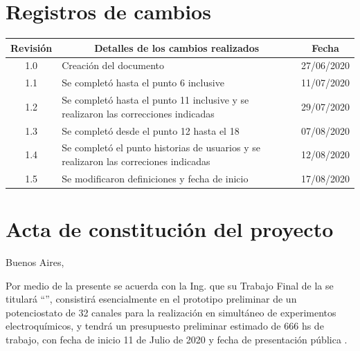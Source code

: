 \documentclass[11pt]{charter}
\begin{document}
\maketitle
\thispagestyle{empty}
\pagebreak


\thispagestyle{empty}
{\setlength{\parskip}{0pt}
\tableofcontents{}
}
\pagebreak


\section{Registros de cambios}
\label{sec:registro}


\begin{table}[ht]
\label{tab:registro}
\centering

\begin{tabularx}{\linewidth}{@{}|c|X|c|@{}}
\hline
\rowcolor[HTML]{C0C0C0} 
Revisión & \multicolumn{1}{c|}{\cellcolor[HTML]{C0C0C0}Detalles de los cambios realizados} & Fecha      \\ \hline
1.0      & Creación del documento     & 27/06/2020 \\ \hline
1.1      & Se completó hasta el punto 6 inclusive  & 11/07/2020  \\ \hline
1.2      & Se completó hasta el punto 11 inclusive y se realizaron las correcciones indicadas                  & 29/07/2020\\ \hline
1.3      & Se completó desde el punto 12 hasta el 18   & 07/08/2020\\ \hline
1.4      & Se completó el punto historias de usuarios y se realizaron las correciones indicadas  & 12/08/2020\\ \hline
1.5      & Se modificaron definiciones y fecha de inicio  & 17/08/2020\\ \hline
\end{tabularx}
\end{table}

\pagebreak



\section{Acta de constitución del proyecto}
\label{sec:acta}

\begin{flushright}
Buenos Aires, \fechaInicioName
\end{flushright}

\vspace{2cm}

Por medio de la presente se acuerda con la Ing. \authorname\hspace{1px} que su Trabajo Final de la \degreename\hspace{1px} se titulará ``\ttitle'', consistirá esencialmente en el prototipo preliminar de un potenciostato de 32 canales para la realización en simultáneo de experimentos electroquímicos, y tendrá un presupuesto preliminar estimado de 666 hs de trabajo, con fecha de inicio 11 de Julio de 2020\hspace{1px} y fecha de presentación pública \fechaFinalName.
\end{document}
